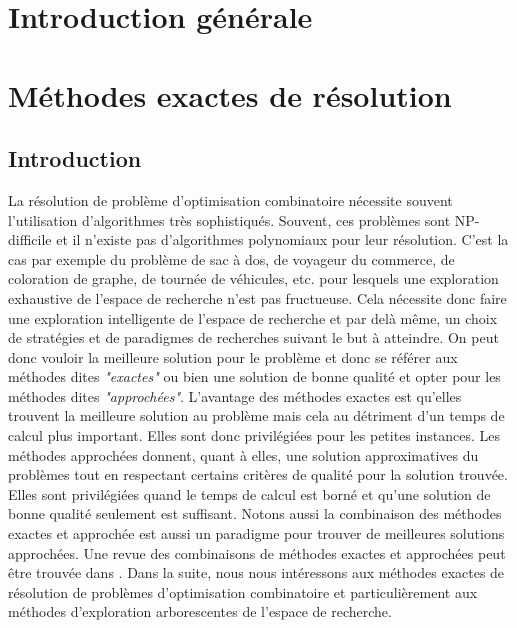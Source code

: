 \documentclass[12pt,a4paper,oneside]{book}
\theoremstyle{definition}
\begin{document}
    \tableofcontents
    \newpage
    \chapter*{Introduction générale}
    
	
	\chapter{Méthodes exactes de résolution}
	\section{Introduction}
	La résolution de problème d'optimisation combinatoire nécessite souvent l'utilisation d'algorithmes très sophistiqués. Souvent, ces problèmes sont NP-difficile et il n'existe pas d'algorithmes polynomiaux pour leur résolution. C'est la cas par exemple du problème de sac à dos, de voyageur du commerce, de coloration de graphe, de tournée de véhicules, etc. pour lesquels une exploration exhaustive de l'espace de recherche n'est pas fructueuse. Cela nécessite donc faire une exploration intelligente de l'espace de recherche et par delà même, un choix de stratégies et de paradigmes de recherches suivant le but à atteindre. On peut donc vouloir la meilleure solution pour le problème et donc se référer aux méthodes dites \textit{"exactes"} ou bien une solution de bonne qualité et opter pour les méthodes dites \textit{"approchées"}. L'avantage des méthodes exactes est qu'elles trouvent la meilleure solution au problème mais cela au détriment d'un temps de calcul plus important. Elles sont donc privilégiées pour les petites instances. Les méthodes approchées donnent, quant à elles, une solution approximatives du problèmes tout en respectant certains critères de qualité pour la solution trouvée. Elles sont privilégiées quand le temps de calcul est borné et qu'une solution de bonne qualité seulement est suffisant. Notons aussi la combinaison des méthodes exactes et approchée est aussi un paradigme pour trouver de meilleures solutions approchées. Une revue des combinaisons de méthodes exactes et approchées peut être trouvée dans \cite{Puchinger2005}. Dans la suite, nous nous intéressons aux méthodes exactes de résolution de problèmes d'optimisation combinatoire et particulièrement aux méthodes d'exploration arborescentes de l'espace de recherche. 
	 
\end{document}
